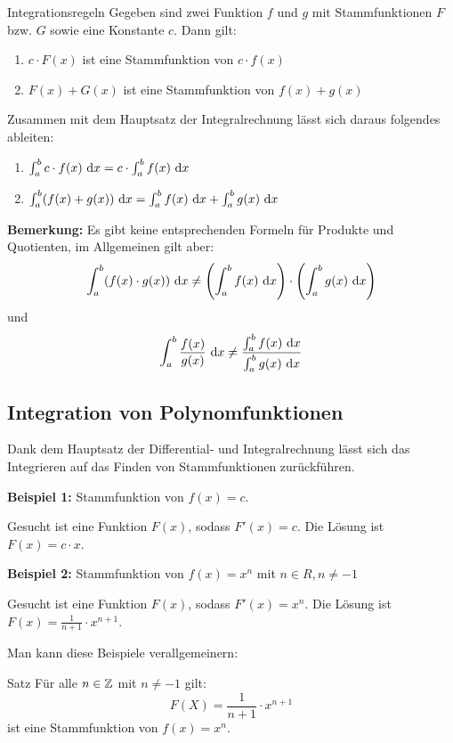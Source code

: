 \begin{definition}{Integrationsregeln}
    Gegeben sind zwei Funktion $f$ und $g$ mit Stammfunktionen $F$ bzw. $G$ sowie eine Konstante $c$.
    Dann gilt:
    \begin{enumerate}
        \item $c \cdot F(x)$ ist eine Stammfunktion von $c \cdot f(x)$
        \item $F(x) + G(x)$ ist eine Stammfunktion von $f(x) + g(x)$
    \end{enumerate}
\end{definition}
\begin{definition}{}
    Zusammen mit dem Hauptsatz der Integralrechnung lässt sich daraus folgendes ableiten:
    \begin{enumerate}
        \item $\int_a^b c \cdot f(x) \ \mathrm{d} x = c \cdot \int_a^b f(x) \ \mathrm{d} x$
        \item $\int_a^b (f(x) + g(x)) \ \mathrm{d} x = \int_a^b f(x) \ \mathrm{d} x + \int_a^b g(x) \ \mathrm{d} x$
    \end{enumerate}
\end{definition}

\newpage

\textbf{Bemerkung:} Es gibt keine entsprechenden Formeln für Produkte und Quotienten, im Allgemeinen gilt aber: \[\int_a^b (f(x) \cdot g(x)) \ \mathrm{d} x \neq \left(\int_a^b f(x) \ \mathrm{d} x\right) \cdot \left(\int_a^b g(x) \ \mathrm{d} x\right)\] und \[\int_a^b \frac{f(x)}{g(x)} \ \mathrm{d} x \neq \frac{\int_a^b f(x) \ \mathrm{d} x}{\int_a^b g(x) \ \mathrm{d} x}\]

\subsection{Integration von Polynomfunktionen}\label{subsec:integration-polynomfunktionen}

Dank dem Hauptsatz der Differential- und Integralrechnung lässt sich das Integrieren auf das Finden von Stammfunktionen zurückführen.

\textbf{Beispiel 1:} Stammfunktion von $f(x) = c$.

\RIGHTarrow Gesucht ist eine Funktion $F(x)$, sodass $F'(x) = c$.
Die Lösung ist $F(x) = c \cdot x$.

\textbf{Beispiel 2:} Stammfunktion von $f(x) = x^n$ mit $n \in R, n \neq -1$

\RIGHTarrow Gesucht ist eine Funktion $F(x)$, sodass $F'(x) = x^n$.
Die Lösung ist $F(x) = \frac{1}{n + 1} \cdot x^{n + 1}$.

Man kann diese Beispiele verallgemeinern:
\begin{definition}{Satz}
    Für alle $n \in \mathbb{Z}$ mit $n \neq -1$ gilt: \[F(X) = \frac{1}{n + 1} \cdot x^{n + 1}\] ist eine Stammfunktion von $f(x) = x^n$.
\end{definition}


